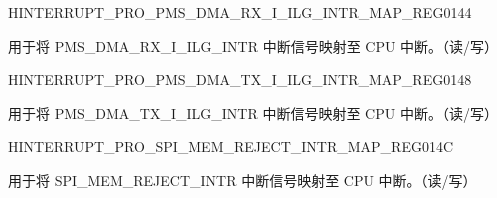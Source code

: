 \begin{register}{H}{INTERRUPT\_PRO\_PMS\_DMA\_RX\_I\_ILG\_INTR\_MAP\_REG}{\hexprefix{}0144}\label{regdesc:INTERRUPTPROPMSDMARXIILGINTRMAPREG}
%
%
\regnewline%
\begin{regdesc}\begin{reglist}
\label{fielddesc:INTERRUPTPROPMSDMARXIILGINTRMAP}\item [INTERRUPT\_PRO\_PMS\_DMA\_RX\_I\_ILG\_INTR\_MAP] 用于将 PMS\_DMA\_RX\_I\_ILG\_INTR 中断信号映射至 CPU 中断。（读/写）
\end{reglist}\end{regdesc}
\end{register}


\begin{register}{H}{INTERRUPT\_PRO\_PMS\_DMA\_TX\_I\_ILG\_INTR\_MAP\_REG}{\hexprefix{}0148}\label{regdesc:INTERRUPTPROPMSDMATXIILGINTRMAPREG}
%
%
\regnewline%
\begin{regdesc}\begin{reglist}
\label{fielddesc:INTERRUPTPROPMSDMATXIILGINTRMAP}\item [INTERRUPT\_PRO\_PMS\_DMA\_TX\_I\_ILG\_INTR\_MAP] 用于将 PMS\_DMA\_TX\_I\_ILG\_INTR 中断信号映射至 CPU 中断。（读/写）
\end{reglist}\end{regdesc}
\end{register}


\begin{register}{H}{INTERRUPT\_PRO\_SPI\_MEM\_REJECT\_INTR\_MAP\_REG}{\hexprefix{}014C}\label{regdesc:INTERRUPTPROSPIMEMREJECTINTRMAPREG}
%
%
\regnewline%
\begin{regdesc}\begin{reglist}
\label{fielddesc:INTERRUPTPROSPIMEMREJECTINTRMAP}\item [INTERRUPT\_PRO\_SPI\_MEM\_REJECT\_INTR\_MAP] 用于将 SPI\_MEM\_REJECT\_INTR 中断信号映射至 CPU 中断。（读/写）
\end{reglist}\end{regdesc}
\end{register}


